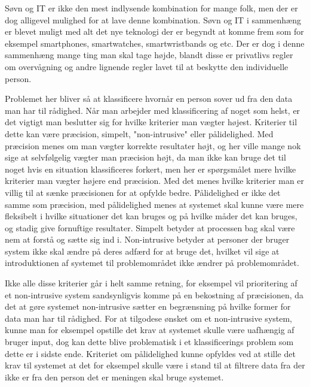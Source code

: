 \begin{comment}
Dette kapitel indeholder forskning omkring søvn, hvor forskellige metoder til at detektere søvn bliver beskrevet.
Hvorefter metoderne bliver sammenlignet med hinanden for at se på hvilket metoder vil kunne bruges til dette projekt.
Til slut vil der blive set på en enkelt metode i dybden som et proof of concept.
\end{comment}
Søvn og IT er ikke den mest indlysende kombination for mange folk, men der er dog alligevel mulighed for at lave denne kombination.
Søvn og IT i sammenhæng er blevet muligt med alt det nye teknologi der er begyndt at komme frem som for eksempel smartphones, smartwatches, smartwristbands og etc.
Der er dog i denne sammenhæng mange ting man skal tage højde, blandt disse er privatlivs regler om overvågning og andre lignende regler lavet til at beskytte den individuelle person.

Problemet her bliver så at klassificere hvornår en person sover ud fra den data man har til rådighed.
Når man arbejder med klassificering af noget som helst, er det vigtigt man beslutter sig for hvilke kriterier man vægter højest.
Kriterier til dette kan være præcision, simpelt, "non-intrusive" eller pålidelighed.
Med præcision menes om man vægter korrekte resultater højt, og her ville mange nok sige at selvfølgelig vægter man præcision højt, da man ikke kan bruge det til noget hvis en situation klassificeres forkert, men her er spørgsmålet mere hvilke kriterier man vægter højere end præcision.
Med det menes hvilke kriterier man er villig til at sænke præcisionen for at opfylde bedre.
Pålidelighed er ikke det samme som præcision, med pålidelighed menes at systemet skal kunne være mere fleksibelt i hvilke situationer det kan bruges og på hvilke måder det kan bruges, og stadig give fornuftige resultater.
Simpelt betyder at processen bag skal være nem at forstå og sætte sig ind i.
Non-intrusive betyder at personer der bruger system ikke skal ændre på deres adfærd for at bruge det, hvilket vil sige at introduktionen af systemet til problemområdet ikke ændrer på problemområdet.

Ikke alle disse kriterier går i helt samme retning, for eksempel vil prioritering af et non-intrusive system sandsynligvis komme på en bekostning af præcisionen, da det at gøre systemet non-intrusive sætter en begrænsning på hvilke former for data man har til rådighed.
For at tilgodese ønsket om et non-intrusive system, kunne man for eksempel opstille det krav at systemet skulle være uafhængig af bruger input, dog kan dette blive problematisk i et klassificerings problem som dette er i sidste ende.
Kriteriet om pålidelighed kunne opfyldes ved at stille det krav til systemet at det for eksempel skulle være i stand til at filtrere data fra der ikke er fra den person det er meningen skal bruge systemet.

